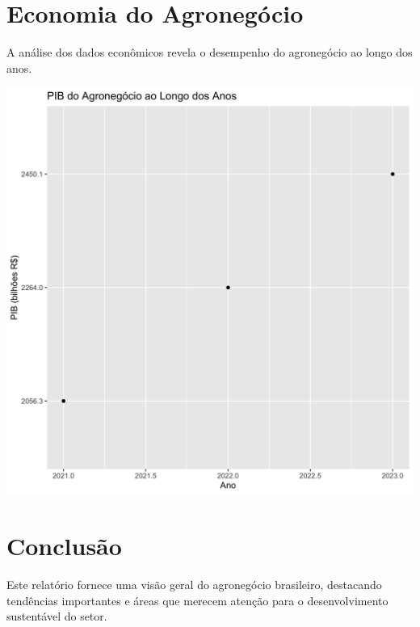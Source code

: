 \documentclass{article}
\begin{document}
\section{Economia do Agronegócio}
A análise dos dados econômicos revela o desempenho do agronegócio ao longo dos anos.

\includegraphics[width=\textwidth]{build/pib_agronegocio.png}

\section{Conclusão}
Este relatório fornece uma visão geral do agronegócio brasileiro, destacando tendências importantes e áreas que merecem atenção para o desenvolvimento sustentável do setor.
\end{document}

